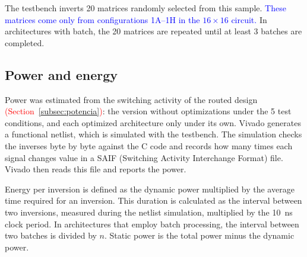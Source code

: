 The testbench inverts 20 matrices randomly selected from this sample. \textcolor{blue}{These matrices come only from configurations 1A--1H in the $16 \times 16$ circuit.} In architectures with batch, the 20 matrices are repeated until at least 3 batches are completed.



\subsection{\texorpdfstring{Power and energy}{Power and energy}}\label{subsec:hw-potencia}
Power was estimated from the switching activity of the routed design \textcolor{red}{(Section~\ref{subsec:potencia})}: the version without optimizations under the 5 test conditions, and each optimized architecture only under its own. Vivado generates a functional netlist, which is simulated with the testbench. The simulation checks the inverses byte by byte against the C code and records how many times each signal changes value in a SAIF (Switching Activity Interchange Format) file. Vivado then reads this file and reports the power.

Energy per inversion is defined as the dynamic power multiplied by the average time required for an inversion. This duration is calculated as the interval between two inversions, measured during the netlist simulation, multiplied by the 10~ns clock period. In architectures that employ batch processing, the interval between two batches is divided by $n$.
Static power is the total power minus the dynamic power.
